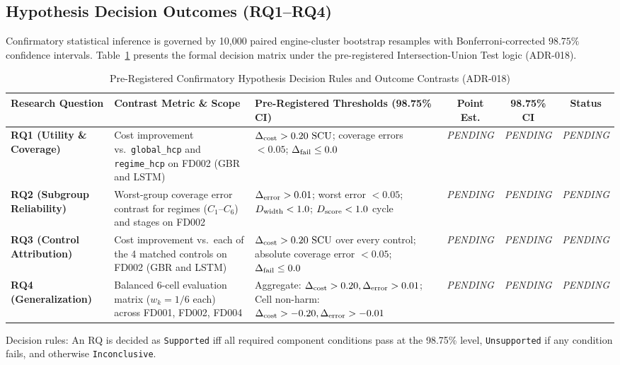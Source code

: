 \subsection{Hypothesis Decision Outcomes (RQ1--RQ4)}
\label{subsec:hypothesis_decisions}
Confirmatory statistical inference is governed by 10,000 paired engine-cluster bootstrap resamples with Bonferroni-corrected $98.75\%$ confidence intervals. Table~\ref{tab:hypothesis_decision_matrix} presents the formal decision matrix under the pre-registered Intersection-Union Test logic (ADR-018).

\begin{table}[htbp]
\centering
\caption{Pre-Registered Confirmatory Hypothesis Decision Rules and Outcome Contrasts (ADR-018)}
\label{tab:hypothesis_decision_matrix}
\begin{tabular}{lp{4.2cm}p{5.0cm}ccc}
\toprule
\textbf{Research Question} & \textbf{Contrast Metric \& Scope} & \textbf{Pre-Registered Thresholds (98.75\% CI)} & \textbf{Point Est.} & \textbf{98.75\% CI} & \textbf{Status} \\
\midrule
\textbf{RQ1 (Utility \& Coverage)} & Cost improvement vs.\ \texttt{global\_hcp} and \texttt{regime\_hcp} on FD002 (GBR and LSTM) & $\Delta_{\text{cost}} > 0.20~\text{SCU}$; coverage errors $< 0.05$; $\Delta_{\text{fail}} \le 0.0$ & \textit{PENDING} & \textit{PENDING} & \textit{PENDING} \\
\midrule
\textbf{RQ2 (Subgroup Reliability)} & Worst-group coverage error contrast for regimes ($C_1$--$C_6$) and stages on FD002 & $\Delta_{\text{error}} > 0.01$; worst error $< 0.05$; $D_{\text{width}} < 1.0$; $D_{\text{score}} < 1.0$ cycle & \textit{PENDING} & \textit{PENDING} & \textit{PENDING} \\
\midrule
\textbf{RQ3 (Control Attribution)} & Cost improvement vs.\ each of the 4 matched controls on FD002 (GBR and LSTM) & $\Delta_{\text{cost}} > 0.20~\text{SCU}$ over every control; absolute coverage error $< 0.05$; $\Delta_{\text{fail}} \le 0.0$ & \textit{PENDING} & \textit{PENDING} & \textit{PENDING} \\
\midrule
\textbf{RQ4 (Generalization)} & Balanced 6-cell evaluation matrix ($w_k=1/6$ each) across FD001, FD002, FD004 & Aggregate: $\Delta_{\text{cost}} > 0.20, \Delta_{\text{error}} > 0.01$; Cell non-harm: $\Delta_{\text{cost}} > -0.20, \Delta_{\text{error}} > -0.01$ & \textit{PENDING} & \textit{PENDING} & \textit{PENDING} \\
\bottomrule
\end{tabular}
\begin{flushleft}
\footnotesize Decision rules: An RQ is decided as \texttt{Supported} iff all required component conditions pass at the 98.75\% level, \texttt{Unsupported} if any condition fails, and otherwise \texttt{Inconclusive}.
\end{flushleft}
\end{table}
